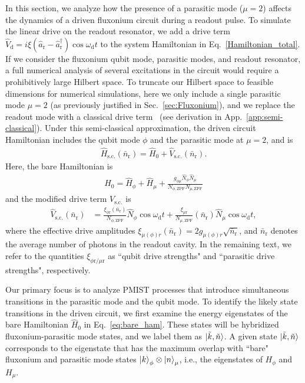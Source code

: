 \documentclass[%
reprint,
superscriptaddress,
 amsmath,amssymb,
 aps,
 prx,
longbibliography,
floatfix,
]{revtex4-2}
\begin{document}
In this section, we analyze how the presence of a parasitic mode ($\mu=2$) affects the dynamics of a driven fluxonium circuit during a readout pulse. To simulate the linear drive on the readout resonator, we add a drive term $\hat{V}_\textrm{d}=i\xi (\hat a_\textrm{r}-\hat a_\textrm{r}^\dagger)\cos{\omega_\textrm{d} t}$ to the system Hamiltonian in Eq.~\ref{Hamiltonian_total}. If we consider the fluxonium qubit mode, parasitic modes, and readout resonator, a full numerical analysis of several excitations in the circuit would require a prohibitively large Hilbert space. To truncate our Hilbert space to feasible dimensions for numerical simulations, here we only include a single parasitic mode $\mu=2$ (as previously justified in Sec.~\ref{sec:Fluxonium}), and we replace the readout mode with a classical drive term~\cite{cohen2023reminiscence,dumas2024unified,xiao2023diagrammatic} (see derivation in App.~\ref{app:semi-classical}). Under this semi-classical approximation, the driven circuit Hamiltonian includes the qubit mode $\phi$ and the parasitic mode at $\mu=2$, and is
\begin{align}
  \hat H_\textrm{s.c.}(\bar n_\textrm{r})=\hat H_0+\hat V_\textrm{s.c.}(\bar n_\textrm{r}).  \label{eq:drive_Ham}
\end{align}
Here, the bare Hamiltonian is
\begin{align}
\hat H_0=\hat H_\phi+\hat H_{\mu}+\frac{g_{\phi\mu}\hat N_\phi \hat N_\mu }{N_{\phi,\mathrm{ZPF}}N_{\mu,\mathrm{ZPF}}} \label{eq:bare_ham} 
\end{align}
and the modified drive term $V_\textrm{s.c.}$ is
\begin{align}
    \hat V_\textrm{s.c.}(\bar n_\textrm{r})&=\frac{\xi_{\phi \textrm{r}}(\bar n_\textrm{r})}{N_{\phi,\mathrm{ZPF}}} \hat N_\phi\cos{\omega_\textrm{d} t}+\frac{\xi_{\mu \textrm{r}}}{N_{\mu, \mathrm{ZPF}}}(\bar n_\textrm{r}) \hat N_\mu\cos{\omega_\textrm{d} t}\label{eq:drive},
\end{align}
where the effective drive amplitudes $\xi_{\mu(\phi) r}(\bar n_\textrm{r})=2g_{\mu(\phi) r}\sqrt{\bar n_\textrm{r}}$, and $\bar n_\textrm{r}$ denotes the average number of photons in the readout cavity. In the remaining text, we refer to the quantities $\xi_{\phi \textrm{r}/\mu \textrm{r}}$ as  ``qubit drive strengths" and ``parasitic drive strengths", respectively. 

Our primary focus is to analyze PMIST processes that introduce simultaneous transitions in the parasitic mode and the qubit mode. To identify the likely state transitions in the driven circuit, we first examine the energy eigenstates of the bare Hamiltonian $\hat{H}_0$ in Eq.~\ref{eq:bare_ham}. These states will be hybridized fluxonium-parasitic mode states, and we label them as $\ket{\tilde{k}, \tilde{n}}$.  A given state $\ket{\tilde{k}, \tilde{n}}$ corresponds to the eigenstate that has the maximum overlap with ``bare" fluxonium and parasitic mode states $\ket{k}_\phi\otimes\ket{n}_\mu$, i.e., the eigenstates of $H_{\phi}$ and $H_{\mu}$.
\end{document}
